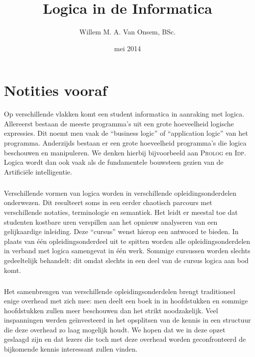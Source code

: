 \documentclass[titlepage,a4paper]{book}
\title{Logica in de Informatica}
\author{Willem M. A. Van Onsem, BSc.}
\date{mei 2014}
\newcommand{\prolog}{\textsc{Prolog}}
\newcommand{\idp}{\textsc{Idp}}
\begin{document}
\frontmatter
\begin{titlepage}
\maketitle
\end{titlepage}
\chapter*{Notities vooraf}
Op verschillende vlakken komt een student informatica in aanraking met logica. Allereerst bestaan de meeste programma's uit een grote hoeveelheid logische expressies. Dit noemt men vaak de ``business logic'' of ``application logic'' van het programma. Anderzijds bestaan er een grote hoeveelheid programma's die logica beschouwen en manipuleren. We denken hierbij bijvoorbeeld aan \prolog{} en \idp{}. Logica wordt dan ook vaak als de fundamentele bouwsteen gezien van de Artifici\"ele intelligentie.
\paragraph{}
Verschillende vormen van logica worden in verschillende opleidingsonderdelen onderwezen. Dit resulteert soms in een eerder chaotisch parcours met verschillende notaties, terminologie en semantiek. Het leidt er meestal toe dat studenten kostbare uren verspillen aan het opnieuw analyseren van een gelijkaardige inleiding. Deze ``cursus'' wenst hierop een antwoord te bieden. In plaats van \'e\'en opleidingsonderdeel uit te spitten worden alle opleidingsonderdelen in verband met logica samengevat in \'e\'en werk. Sommige cursussen worden slechts gedeeltelijk behandelt: dit omdat slechts in een deel van de cursus logica aan bod komt.
\paragraph{}
Het samenbrengen van verschillende opleidingsonderdelen brengt traditioneel enige overhead met zich mee: men deelt een boek in in hoofdstukken en sommige hoofdstukken zullen meer beschouwen dan het strikt noodzakelijk. Veel inspanningen werden ge\"investeerd in het opsplitsen van de kennis in een structuur die deze overhead zo laag mogelijk houdt. We hopen dat we in deze opzet geslaagd zijn en dat lezers die toch met deze overhead worden geconfronteerd de bijkomende kennis interessant zullen vinden.
\end{document}
